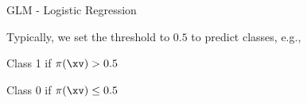 \documentclass[10pt,compress,t,notes=noshow, xcolor=table]{beamer}
\begin{document}
\begin{framev}[align=top]{GLM - Logistic Regression}
\begin{itemizeM}
\item Typically, we set the threshold to $0.5$ to predict classes, e.g.,
\begin{itemizeS}
\item Class 1 if $\pi(\xv) > 0.5$
\item Class 0 if $\pi(\xv) \leq 0.5$
\end{itemizeS}
\end{itemizeM}
\end{framev}


\end{document}

